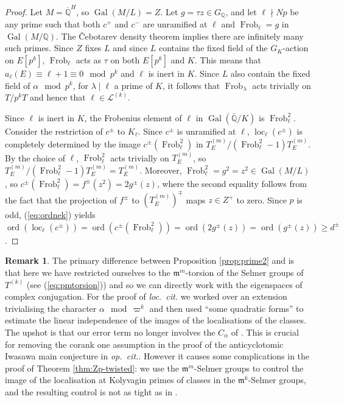 \documentclass[a4paper,10pt]{amsart}
\numberwithin{equation}{section}
\numberwithin{equation}{section}
\theoremstyle{plain}
\theoremstyle{definition}
\newtheorem{rmk}[thm]{Remark}
\theoremstyle{definition}
\theoremstyle{plain}
\theoremstyle{plain}
\theoremstyle{plain}
\theoremstyle{plain}
\DeclareMathOperator{\ord}{ord}
\newcommand{\Q}{\mathbb{Q}}
\DeclareMathOperator{\frob}{Frob}
\DeclareMathOperator{\loc}{loc}
\newcommand{\fm}{\mathfrak{m}}
\begin{document}
\begin{proof}
Let $M =  \overline{\Q}^{H}$, so $\operatorname{Gal}(M/L) = Z$. Let $g = \tau z \in G_\Q$, and let 
$\ell\nmid Np$ be any prime such that both $c^+$ and $c^-$ are unramified at $\ell$ and $\frob_\ell = g$ in $\operatorname{Gal}(M/\Q)$. 
The \v{C}ebotarev density theorem implies there are infinitely many such primes.
 Since $Z$ fixes $L$ and since $L$ contains the fixed field of the $G_K$-action on $E[p^k]$,
$\frob_\ell$ acts as $\tau$ on both $E[p^k]$ and $K$.
This means that $a_\ell(E) \equiv \ell +1 \equiv 0 \mod p^k$ and $\ell$ is inert in $K$. 
Since $L$ also contain the fixed field of $\alpha\mod p^k$, for $\lambda\mid \ell$ a prime of $K$, it follows that  $\frob_\lambda$
acts trivially on $T/p^kT$ and hence that $\ell\in \mathscr{L}^{(k)}$. 

Since $\ell$ is inert in $K$, the Frobenius element of $\ell$ in $\operatorname{Gal}(\bar{\Q}/K)$ is $\frob_\ell^2$. Consider the restriction of
$c^\pm$ to $K_\ell$. Since $c^\pm$ is unramified at $\ell$, $\loc_\ell(c^\pm)$ is completely determined by the image $c^\pm(\frob_\ell^2)$ in $T_E^{(m)}/(\frob_\ell^2-1)T_E^{(m)}$. By the choice of $\ell$, $\frob_\ell^2$ acts trivially on
$T_E^{(m)}$, so  $T_E^{(m)}/(\frob_\ell^2-1)T_E^{(m)} = T_E^{(m)}$. Moreover, $\frob_\ell^2 = g^2  = z^2 \in \operatorname{Gal}(M/L)$,
so $c^\pm(\frob_\ell^2) = f^\pm(z^2) = 2g^\pm(z)$, where the second equality follows from the fact that the projection of $f^\pm$ to $(T_E^{(m)})^\mp$ maps $z\in Z^+$ to zero. Since $p$ is odd, (\ref{eq:ordnek}) yields $\ord(\loc_{\ell}(c^\pm)) = 
\ord(c^\pm(\frob_\ell^2)) = \ord(2g^\pm(z)) = \ord(g^\pm(z)) \geq d^\pm$.
\end{proof}

\begin{rmk}\label{rmkcalpha}
The primary difference between Proposition \ref{prop:prime2} and \cite[Prop.~3.3.6]{eisenstein} is  that here we have restricted ourselves to the $\fm^m$-torsion of the Selmer groups of $T^{(k)}$  (see (\ref{eq:pmtorsion})) and so we can directly work with the eigenspaces of complex conjugation.
For the proof of {\em loc.~cit.} we worked over an extension trivialising the character $\alpha \mod \varpi^k$ and then used ``some quadratic forms'' to 
estimate the linear independence of the images of the localisations of the classes.  The upshot is that our error term no longer involves
the $C_{\alpha}$ of \cite{eisenstein}. This is crucial for removing the corank one assumption in the proof of the anticyclotomic Iwasawa main conjecture in {\em op.~cit.}. However it causes some complications in the proof of Theorem \ref{thm:Zp-twisted}: we use the $\fm^m$-Selmer groups to control the 
image of the localisation at Kolyvagin primes of classes in the $\fm^k$-Selmer groups, and the resulting control is not as tight as in \cite{eisenstein}.
 \end{rmk}
\end{document}
